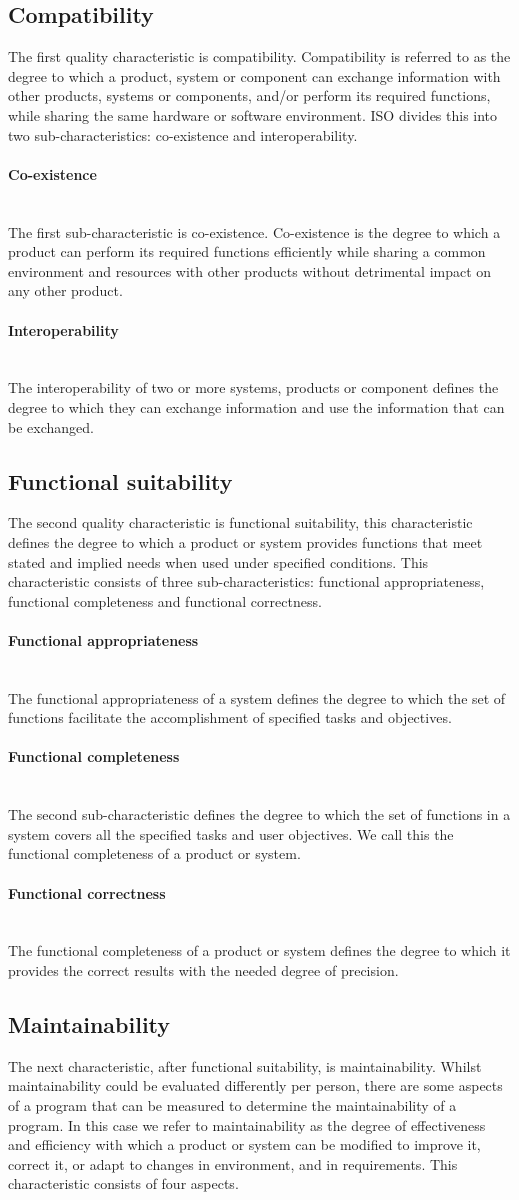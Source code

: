 \documentclass[twoside]{uva-inf-bachelor-thesis}
\newcommand{\myparagraph}[1]{\paragraph{#1}\mbox{}\\}
\begin{document}
\subsection{Compatibility}
The first quality characteristic is compatibility. Compatibility is referred to as the degree to which a product, system or component can exchange information with other products, systems or components, and/or perform its required functions, while sharing the same hardware or software environment. ISO divides this into two sub-characteristics: co-existence and interoperability.

\myparagraph{Co-existence}
The first sub-characteristic is co-existence. Co-existence is the degree to which a product can perform its required functions efficiently while sharing a common environment and resources with other products without detrimental impact on any other product.

\myparagraph{Interoperability}
The interoperability of two or more systems, products or component defines the degree to which they can exchange information and use the information that can be exchanged.

\subsection{Functional suitability}
The second quality characteristic is functional suitability, this characteristic defines the degree to which a product or system provides functions that meet stated and implied needs when used under specified conditions. This characteristic consists of three sub-characteristics: functional appropriateness, functional completeness and functional correctness.

\myparagraph{Functional appropriateness}
The functional appropriateness of a system defines the degree to which the set of functions facilitate the accomplishment of specified tasks and objectives.

\myparagraph{Functional completeness}
The second sub-characteristic defines the degree to which the set of functions in a system covers all the specified tasks and user objectives. We call this the functional completeness of a product or system.

\myparagraph{Functional correctness}
The functional completeness of a product or system defines the degree to which it provides the correct results with the needed degree of precision.

\subsection{Maintainability}
The next characteristic, after functional suitability, is maintainability. Whilst maintainability could be evaluated differently per person, there are some aspects of a program that can be measured to determine the maintainability of a program. In this case we refer to maintainability as the degree of effectiveness and efficiency with which a product or system can be modified to improve it, correct it, or adapt to changes in environment, and in requirements. This characteristic consists of four aspects.
\end{document}
